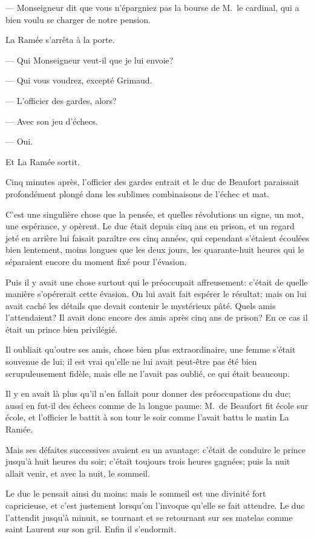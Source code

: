 — Monseigneur dit que vous n'épargniez pas la bourse de M.~le cardinal, qui a bien voulu se charger de notre pension.

La Ramée s'arrêta à la porte.

— Qui Monseigneur veut-il que je lui envoie?

— Qui vous voudrez, excepté Grimaud.

— L'officier des gardes, alors?

— Avec son jeu d'échecs.

— Oui.

Et La Ramée sortit.

Cinq minutes après, l'officier des gardes entrait et le duc de Beaufort paraissait profondément plongé dans les sublimes combinaisons de l'échec et mat.

C'est une singulière chose que la pensée, et quelles révolutions un signe, un mot, une espérance, y opèrent. Le duc était depuis cinq ans en prison, et un regard jeté en arrière lui faisait paraître ces cinq années, qui cependant s'étaient écoulées bien lentement, moins longues que les deux jours, les quarante-huit heures qui le séparaient encore du moment fixé pour l'évasion.

Puis il y avait une chose surtout qui le préoccupait affreusement: c'était de quelle manière s'opérerait cette évasion. On lui avait fait espérer le résultat; mais on lui avait caché les détails que devait contenir le mystérieux pâté. Quels amis l'attendaient? Il avait donc encore des amis après cinq ans de prison? En ce cas il était un prince bien privilégié.

Il oubliait qu'outre ses amis, chose bien plus extraordinaire, une femme s'était souvenue de lui; il est vrai qu'elle ne lui avait peut-être pas été bien scrupuleusement fidèle, mais elle ne l'avait pas oublié, ce qui était beaucoup.

Il y en avait là plus qu'il n'en fallait pour donner des préoccupations du duc; aussi en fut-il des échecs comme de la longue paume: M.~de Beaufort fit école sur école, et l'officier le battit à son tour le soir comme l'avait battu le matin La Ramée.

Mais ses défaites successives avaient eu un avantage: c'était de conduire le prince jusqu'à huit heures du soir; c'était toujours trois heures gagnées; puis la nuit allait venir, et avec la nuit, le sommeil.

Le duc le pensait ainsi du moins: mais le sommeil est une divinité fort capricieuse, et c'est justement lorsqu'on l'invoque qu'elle se fait attendre. Le duc l'attendit jusqu'à minuit, se tournant et se retournant sur ses matelas comme saint Laurent sur son gril. Enfin il s'endormit.

